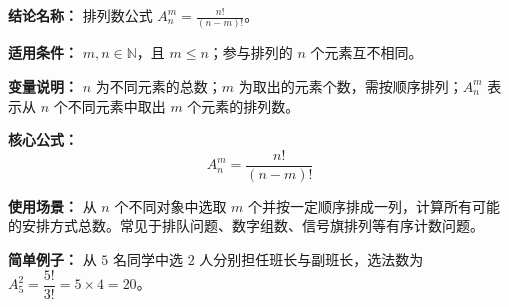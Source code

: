 \textbf{结论名称：} 排列数公式 \(A_n^m = \frac{n!}{(n-m)!}\)。

\textbf{适用条件：} \(m,n \in \mathbb{N}\)，且 \(m \le n\)；参与排列的 \(n\) 个元素互不相同。

\textbf{变量说明：} \(n\) 为不同元素的总数；\(m\) 为取出的元素个数，需按顺序排列；\(A_n^m\) 表示从 \(n\) 个不同元素中取出 \(m\) 个元素的排列数。

\textbf{核心公式：} 
\[
\boxed{A_n^m = \frac{n!}{(n-m)!}}
\]

\textbf{使用场景：} 从 \(n\) 个不同对象中选取 \(m\) 个并按一定顺序排成一列，计算所有可能的安排方式总数。常见于排队问题、数字组数、信号旗排列等有序计数问题。

\textbf{简单例子：} 从 \(5\) 名同学中选 \(2\) 人分别担任班长与副班长，选法数为 \(A_5^2 = \dfrac{5!}{3!} = 5 \times 4 = 20\)。